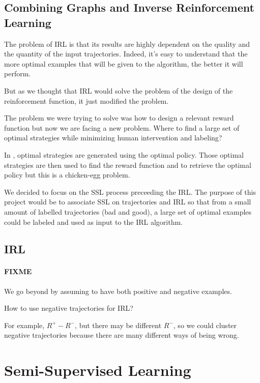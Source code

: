 \documentclass{article}
\begin{document}
\subsection{Combining Graphs and Inverse Reinforcement Learning}

The problem of IRL is that its results are highly dependent on the quality and the quantity of the input trajectories. Indeed, it's easy to understand that the more optimal examples that will be given to the algorithm, the better it will perform.

But as we thought that IRL would solve the problem of the design of the reinforcement function, it just modified the problem.

The problem we were trying to solve was how to design a relevant reward function but now we are facing a new problem. Where to find a large set of optimal strategies while minimizing human intervention and labeling?

In \cite{Ng00}, optimal strategies are generated using the optimal policy. Those optimal strategies are then used to find the reward function and to retrieve the optimal policy but this is a chicken-egg problem.

We decided to focus on the SSL process preceeding the IRL. The purpose of this project would be to associate SSL on trajectories and IRL so that from a small amount of labelled trajectories (bad and good), a large set of optimal examples could be labeled and used as input to the IRL algorithm.


\subsection{IRL}

\paragraph{FIXME}
We go beyond by assuming to have both positive and negative examples.

How to use negative trajectories for IRL?

For example, $R^+ - R^-$, but there may be different $R^-$, so we could cluster negative trajectories because there are many different ways of being wrong.


\section{Semi-Supervised Learning \label{sec:ssl}}
\end{document}
